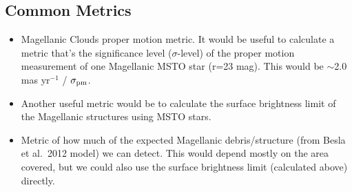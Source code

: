 \begin{enumerate}


\end{enumerate}


\subsection{Common Metrics}
\label{sec:\chpname:metrics}



\begin{itemize}

\item  Magellanic Clouds proper motion metric.
It would be useful to calculate a metric that's the significance level ($\sigma$-level) of the proper motion measurement of one Magellanic MSTO star (r=23 mag).
This would be $\sim$2.0 mas yr$^{-1}$ / $\sigma_{\rm pm}$.

\item Another useful metric would be to calculate the surface
brightness limit of the Magellanic structures using MSTO stars.

\item Metric of how much of the expected Magellanic debris/structure
(from Besla et al.\ 2012 model) we can detect.  This would depend
mostly on the area covered, but we could also use the surface
brightness limit (calculated above) directly.

\end{itemize}





\navigationbar
